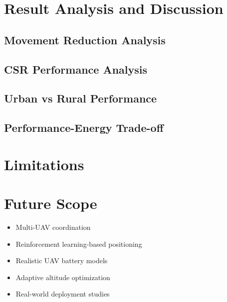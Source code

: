 \documentclass[12pt]{report}
\begin{document}
\chapter{Result Analysis and Discussion}

\section{Movement Reduction Analysis}

\section{CSR Performance Analysis}

\section{Urban vs Rural Performance}

\section{Performance-Energy Trade-off}

\chapter{Limitations}


\chapter{Future Scope}

\begin{itemize}
    \item Multi-UAV coordination
    \item Reinforcement learning-based positioning
    \item Realistic UAV battery models
    \item Adaptive altitude optimization
    \item Real-world deployment studies
\end{itemize}
\end{document}
